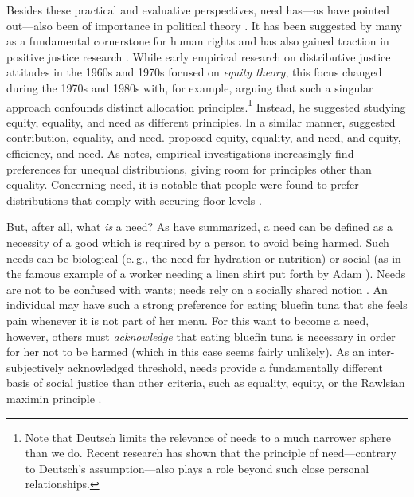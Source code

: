 \documentclass[12pt]{scrartcl}
\begin{document}
Besides these practical and evaluative perspectives, need has---as \cite{bauer_need_2022} have pointed out---also been of importance in political theory \citep{dean_translation_2013,doyal_theory_1984,nussbaum_human_1992,weale_political_1984}.
It has been suggested by many as a fundamental cornerstone for human rights \citep[e.\,g.,][]{brock_needs_2005,gasper_needs_2005,renzo_human_2015} and has also gained traction in positive justice research \citep[for a summary of some recent work, see, e.\,g.,][]{miller_needs-based_2020}.
While early empirical research on distributive justice attitudes in the 1960s and 1970s focused on \textit{equity theory}, this focus changed during the 1970s and 1980s with, for example, \cite{deutsch_equity_1975} arguing that such a singular approach confounds distinct allocation principles.\footnote{Note that Deutsch limits the relevance of needs to a much narrower sphere than we do. Recent research has shown that the principle of need---contrary to Deutsch's assumption---also plays a role beyond such close personal relationships.}
Instead, he suggested studying equity, equality, and need as different principles.
In a similar manner, \cite{schwinger_just_1980} suggested contribution, equality, and need.
\cite{wagstaff_equity_1994} proposed equity, equality, and need, and \cite{konow_fair_2001} equity, efficiency, and need.
As \cite{konow_is_2009} notes, empirical investigations increasingly find preferences for unequal distributions, giving room for principles other than equality.
Concerning need, it is notable that people were found to prefer distributions that comply with securing floor levels \citep[e.\,g.,][]{ahlert_thresholds_2012,frohlich_choosing_1992,frohlich_choices_1987}.

But, after all, what \textit{is} a need?
As \cite{bauer_need_2022} have summarized, a need can be defined as a necessity of a good which is required by a person to avoid being harmed.
Such needs can be biological (e.\,g., the need for hydration or nutrition) or social (as in the famous example of a worker needing a linen shirt put forth by Adam \citealt{smith_wealth_1979}).
Needs are not to be confused with wants; needs rely on a socially shared notion \citep{miller_principles_1999}.
An individual may have such a strong preference for eating bluefin tuna that she feels pain whenever it is not part of her menu.
For this want to become a need, however, others must \textit{acknowledge} that eating bluefin tuna is necessary in order for her not to be harmed (which in this case seems fairly unlikely).
As an inter-subjectively acknowledged threshold, needs provide a fundamentally different basis of social justice than other criteria, such as equality, equity, or the Rawlsian maximin principle \citep[for philosophical overviews on need-based justice, see][]{miller_needs-based_2020,siebel_need_2020}.
\end{document}
